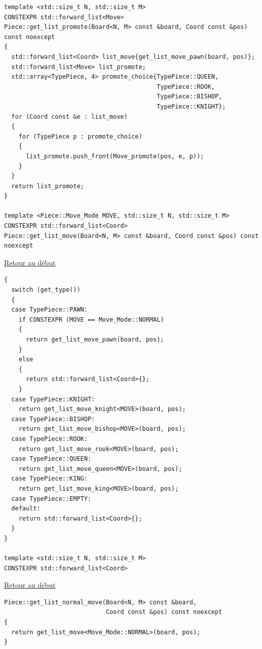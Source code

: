 {\begin{frame}[fragile]
\begin{verbatim}
template <std::size_t N, std::size_t M>
CONSTEXPR std::forward_list<Move>
Piece::get_list_promote(Board<N, M> const &board, Coord const &pos) const noexcept
{
  std::forward_list<Coord> list_move{get_list_move_pawn(board, pos)};
  std::forward_list<Move> list_promote;
  std::array<TypePiece, 4> promote_choice{TypePiece::QUEEN,
                                          TypePiece::ROOK,
                                          TypePiece::BISHOP,
                                          TypePiece::KNIGHT};
  for (Coord const &e : list_move)
  {
    for (TypePiece p : promote_choice)
    {
      list_promote.push_front(Move_promote(pos, e, p));
    }
  }
  return list_promote;
}

template <Piece::Move_Mode MOVE, std::size_t N, std::size_t M>
CONSTEXPR std::forward_list<Coord>
Piece::get_list_move(Board<N, M> const &board, Coord const &pos) const noexcept
\end{verbatim}
\end{frame}

\begin{frame}[fragile]
\hyperlink{conclusion}{Retour au début}\newline
\begin{verbatim}
{
  switch (get_type())
  {
  case TypePiece::PAWN:
    if CONSTEXPR (MOVE == Move_Mode::NORMAL)
    {
      return get_list_move_pawn(board, pos);
    }
    else
    {
      return std::forward_list<Coord>{};
    }
  case TypePiece::KNIGHT:
    return get_list_move_knight<MOVE>(board, pos);
  case TypePiece::BISHOP:
    return get_list_move_bishop<MOVE>(board, pos);
  case TypePiece::ROOK:
    return get_list_move_rook<MOVE>(board, pos);
  case TypePiece::QUEEN:
    return get_list_move_queen<MOVE>(board, pos);
  case TypePiece::KING:
    return get_list_move_king<MOVE>(board, pos);
  case TypePiece::EMPTY:
  default:
    return std::forward_list<Coord>{};
  }
}

template <std::size_t N, std::size_t M>
CONSTEXPR std::forward_list<Coord>
\end{verbatim}
\end{frame}

\begin{frame}[fragile]
\hyperlink{conclusion}{Retour au début}\newline
\begin{verbatim}
Piece::get_list_normal_move(Board<N, M> const &board,
                            Coord const &pos) const noexcept
{
  return get_list_move<Move_Mode::NORMAL>(board, pos);
}


\end{verbatim}
\end{frame}}
